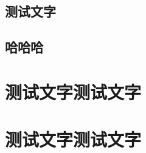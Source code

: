 \documentclass[themecolor=brown]{textbook-cn}%
\begin{document}
\chapter{测试文字}


{\FontSizeSet{15pt}\zhlipsum}




\chapter{哈哈哈}
\zhlipsum[2]


\partintro{\lipsum[2]}
\part*{测试文字测试文字}

\zhlipsum
%
%
\partsubtitle{ }
\partintro{\lipsum[2]}
\part*{测试文字测试文字}
%
\zhlipsum
\end{document}
